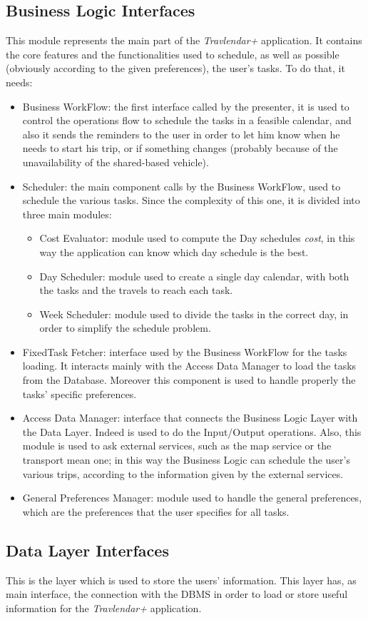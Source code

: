 \subsection*{Business Logic Interfaces}
This module represents the main part of the \emph{Travlendar+} application. It contains the core features and the functionalities used to schedule, as well as possible (obviously according to the given preferences), the user's tasks. To do that, it needs:
\begin{itemize}
    \item Business WorkFlow: the first interface called by the presenter, it is used to control the operations flow to schedule the tasks in a feasible calendar, and also it sends the reminders to the user in order to let him know when he needs to start his trip, or if something changes (probably because of the unavailability of the shared-based vehicle).
    \item Scheduler: the main component calls by the Business WorkFlow, used to schedule the various tasks. Since the complexity of this one, it is divided into three main modules:
    
    \begin{itemize}
        \item Cost Evaluator: module used to compute the Day schedules \emph{cost}, in this way the application can know which day schedule is the best.
        \item Day Scheduler: module used to create a single day calendar, with both the tasks and the travels to reach each task.
        \item Week Scheduler: module used to divide the tasks in the correct day, in order to simplify the schedule problem.
    \end{itemize}
    
    \item FixedTask Fetcher: interface used by the Business WorkFlow for the tasks loading. It interacts mainly with the Access Data Manager to load the tasks from the Database. Moreover this component is used to handle properly the tasks' specific preferences.
    
    \item Access Data Manager: interface that connects the Business Logic Layer with the Data Layer. Indeed is used to do the Input/Output operations. Also, this module is used to ask external services, such as the map service or the transport mean one; in this way the Business Logic can schedule the user's various trips, according to the information given by the external services.
    
    \item General Preferences Manager: module used to handle the general preferences, which are the preferences that the user specifies for all tasks.
    
\end{itemize}

\subsection*{Data Layer Interfaces}
This is the layer which is used to store the users' information. This layer has, as main interface, the connection with the DBMS in order to load or store useful information for the \emph{Travlendar+} application.